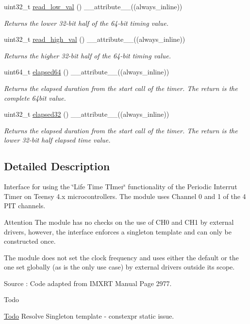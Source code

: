 \begin{DoxyCompactItemize}
uint32\+\_\+t \hyperlink{classPIT__LifetimeTimer_a4f7f8cd3847b9edb19dfa27f048a08cc}{read\+\_\+low\+\_\+val} () \+\_\+\+\_\+attribute\+\_\+\+\_\+((always\+\_\+inline))
\begin{DoxyCompactList}\small\item\em Returns the lower 32-\/bit half of the 64-\/bit timing value. \end{DoxyCompactList}\item 
uint32\+\_\+t \hyperlink{classPIT__LifetimeTimer_a39b0861ac88aec5e53f326409d536bcf}{read\+\_\+high\+\_\+val} () \+\_\+\+\_\+attribute\+\_\+\+\_\+((always\+\_\+inline))
\begin{DoxyCompactList}\small\item\em Returns the higher 32-\/bit half of the 64-\/bit timing value. \end{DoxyCompactList}\item 
uint64\+\_\+t \hyperlink{classPIT__LifetimeTimer_a04adf2272a47d4c81a28c6363e2da4fd}{elapsed64} () \+\_\+\+\_\+attribute\+\_\+\+\_\+((always\+\_\+inline))
\begin{DoxyCompactList}\small\item\em Returns the elapsed duration from the start call of the timer. The return is the complete 64bit value. \end{DoxyCompactList}\item 
uint32\+\_\+t \hyperlink{classPIT__LifetimeTimer_af7481214070333f845a23456b4d75880}{elapsed32} () \+\_\+\+\_\+attribute\+\_\+\+\_\+((always\+\_\+inline))
\begin{DoxyCompactList}\small\item\em Returns the elapsed duration from the start call of the timer. The return is the lower 32-\/bit half elapsed time value. \end{DoxyCompactList}\end{DoxyCompactItemize}


\subsection{Detailed Description}
Interface for using the \char`\"{}\+Life Time T\+Imer\char`\"{} functionality of the Periodic Interrut Timer on Teensy 4.\+x microcontrollers. The module uses Channel 0 and 1 of the 4 P\+IT channels. 

\begin{DoxyAttention}{Attention}
The module has no checks on the use of C\+H0 and C\+H1 by external drivers, however, the interface enforces a singleton template and can only be constructed once. 

The module does not set the clock frequency and uses either the default or the one set globally (as is the only use case) by external drivers outside its scope. 

Source \+: Code adapted from I\+M\+X\+RT Manual Page 2977. 
\end{DoxyAttention}
\begin{DoxyRefDesc}{Todo}
\item[\hyperlink{todo__todo000003}{Todo}]Resolve Singleton template -\/ constexpr static issue. \end{DoxyRefDesc}


